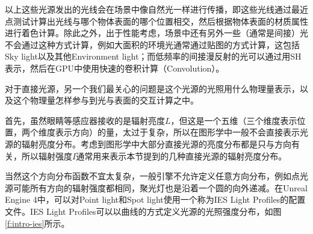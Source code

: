 以上这些光源发出的光线会在场景中像自然光一样进行传播，即这些光线通过最近点测试计算出光线与哪个物体表面的哪个位置相交，然后根据物体表面的材质属性进行着色计算。除此之外，出于性能考虑，场景中还有另外一些（通常是间接）光不会通过这种方式计算，例如大面积的环境光通常通过贴图的方式计算，这包括Sky light以及其他Environment light；而低频率的间接漫反射的光可以通过用SH表示，然后在GPU中使用快速的卷积计算（Convolution）。


对于直接光源，另一个我们最关心的问题是这个光源的光照用什么物理量表示，以及这个物理量怎样参与到光与表面的交互计算之中。

首先，虽然眼睛等感应器接收的是辐射亮度$L$，但这是一个五维（三个维度表示位置，两个维度表示方向）的量，太过于复杂，所以在图形学中一般不会直接表示光源的辐射亮度分布。考虑到图形学中大部分直接光源的亮度分布都是只与方向有关，所以辐射强度$I$通常用来表示本节提到的几种直接光源的辐射亮度分布。

当然这个方向分布函数不宜太复杂，一般引擎不允许定义任意方向分布，例如点光源可能所有方向的辐射强度都相同，聚光灯也是沿着一个圆的向外递减。在Unreal Engine 4中，可以对Point light和Spot light使用一个称为IES Light Profiles的配置文件。IES Light Profiles可以以曲线的方式定义光源的光照强度分布，如图\ref{f:intro-ies}所示。

